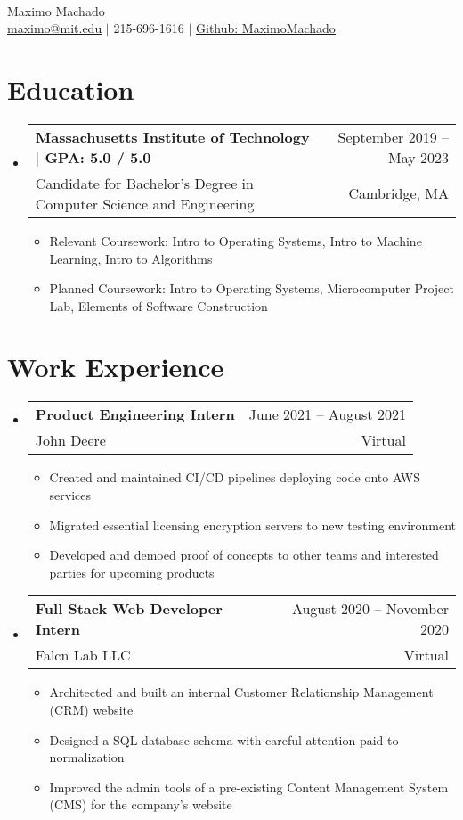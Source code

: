 \documentclass[letterpaper,12pt]{article} %
\makeatletter
\newcommand{\CVItem}[1]{
  \item\small{
    {#1 \vspace{-2pt}}
  }
}
\newcommand{\CVSubheading}[4]{
  \vspace{-2pt}\item
    \begin{tabular*}{0.97\textwidth}[t]{l@{\extracolsep{\fill}}r}
      \textbf{#1} & #2 \\
      \small#3 & \small #4 \\
    \end{tabular*}\vspace{-7pt}
}
\newcommand{\CVSubHeadingListStart}{\begin{itemize}[leftmargin=0.15in, label={}]} %
\newcommand{\CVSubHeadingListEnd}{\end{itemize}}
\newcommand{\CVItemListStart}{\begin{itemize}}
\newcommand{\CVItemListEnd}{\end{itemize}\vspace{-5pt}}
\makeatother
\begin{document}

\begin{minipage}[c]{0.05\textwidth}
  \-\
\end{minipage}

\begin{center}
  \Huge Maximo Machado \\ \vspace{1pt} %
  \small
  \href{mailto:maximo@mit.edu}{maximo@mit.edu} $|$
  215-696-1616 $|$
  \href{https://github.com/MaximoMachado}{Github: MaximoMachado}
\end{center}
\vspace{-17pt} %

\section{Education}
\CVSubHeadingListStart
\CVSubheading
{{Massachusetts Institute of Technology $|$ \small{GPA: 5.0 / 5.0}}}{September 2019 -- May 2023}
{Candidate for Bachelor's Degree in Computer Science and Engineering}{Cambridge, MA}

\CVItemListStart
\CVItem{Relevant Coursework:
  Intro to Operating Systems,
  Intro to Machine Learning,
  Intro to Algorithms}
\CVItem{Planned Coursework:
  Intro to Operating Systems,
  Microcomputer Project Lab,
  Elements of Software Construction}
\CVItemListEnd
\CVSubHeadingListEnd

\section{Work Experience}
\CVSubHeadingListStart
\CVSubheading
{Product Engineering Intern}{June 2021 -- August 2021}
{John Deere}{Virtual}
\CVItemListStart
\CVItem{Created and maintained CI/CD pipelines deploying code onto AWS services}
\CVItem{Migrated essential licensing encryption servers to new testing environment}
\CVItem{Developed and demoed proof of concepts to other teams and interested parties for upcoming products}
\CVItemListEnd
\CVSubheading
{Full Stack Web Developer Intern}{August 2020 -- November 2020}
{Falcn Lab LLC}{Virtual}
\CVItemListStart
\CVItem{Architected and built an internal Customer Relationship Management (CRM) website}
\CVItem{Designed a SQL database schema with careful attention paid to normalization}
\CVItem{Improved the admin tools of a pre-existing Content Management System (CMS) for the company's website}
\CVItemListEnd
\CVSubHeadingListEnd
\end{document}
